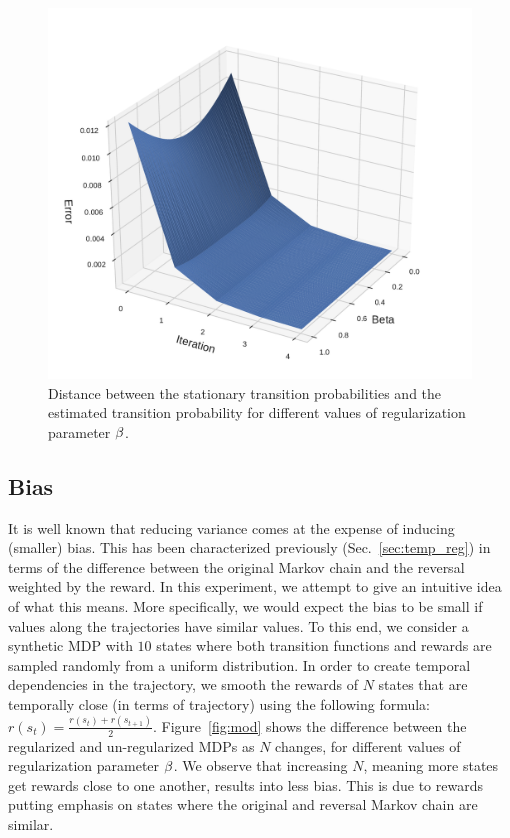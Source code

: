 \begin{figure}
	\centering
	\includegraphics[scale=0.7]{./fig/Markov_mixing.pdf}
\caption[Mixing time experiment]{Distance between the stationary transition probabilities and the estimated transition probability for different values of regularization parameter $\beta$.}
\label{fig:mixing}
\end{figure}

\subsection{Bias}
\label{sec:expe:bias}

It is well known that reducing variance comes at the expense of inducing (smaller) bias.
This has been characterized previously (Sec.~\ref{sec:temp_reg}) in terms of the difference between the original Markov chain and the reversal weighted by the reward. In this experiment, we attempt to give an intuitive idea of what this means. More specifically, we would expect the bias to be small if values along the trajectories have similar values.
To this end, we consider a synthetic MDP with $10$ states where both transition functions and rewards are sampled randomly from a uniform distribution. In order to create temporal dependencies in the trajectory, we smooth the rewards of $N$ states that are temporally close (in terms of trajectory) using the following formula: $ r(s_t) = \frac{r(s_t) + r(s_{t+1})}{2}$.
Figure~\ref{fig:mod} shows the difference between the regularized and un-regularized MDPs as $N$ changes, for different values of regularization parameter $\beta$.
We observe that increasing $N$, meaning more states get rewards close to one another, results into less bias. This is due to rewards putting emphasis on states where the original and reversal Markov chain are similar.

